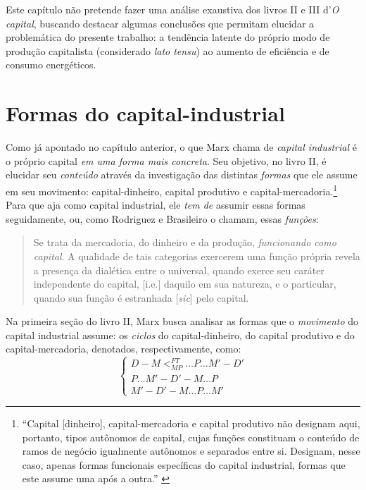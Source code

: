 Este capítulo não pretende fazer uma análise exaustiva dos livros II e III d'\textit{O capital}, buscando destacar algumas conclusões que permitam elucidar a problemática do presente trabalho: a tendência latente do próprio modo de produção capitalista (considerado \textit{lato tensu}) ao aumento de eficiência e de consumo energéticos. 

\section{Formas do capital-industrial}
Como já apontado no capítulo anterior, o que Marx chama de \textit{capital industrial} é o próprio capital \textit{em uma forma mais concreta}. Seu objetivo, no livro II, é elucidar seu \textit{conteúdo} através da investigação das distintas \textit{formas} que ele assume em seu movimento: capital-dinheiro, capital produtivo e capital-mercadoria.\footnote{``Capital [dinheiro], capital-mercadoria e capital produtivo não designam aqui, portanto, tipos autônomos de capital, cujas funções constituam o conteúdo de ramos de negócio igualmente autônomos e separados entre si. Designam, nesse caso, apenas formas funcionais específicas do capital industrial, formas que este assume uma após a outra.'' \parencite[p. 131]{Marx2014}} Para que aja como capital industrial, ele \textit{tem de} assumir essas formas seguidamente, ou, como Rodriguez e Brasileiro o chamam, essas \textit{funções}: 
\begin{quote}
    Se trata da mercadoria, do dinheiro e da produção, \textit{funcionando como capital}. A qualidade de tais categorias exercerem uma função própria revela a presença da dialética entre o universal, quando exerce seu caráter independente do capital, [i.e.] daquilo em sua natureza, e o particular, quando sua função é estranhada [\textit{sic}] pelo capital. \parencite[p. 4, grifo meu]{Rodriguez2017}
\end{quote}

Na primeira seção do livro II, Marx busca analisar as formas que o \textit{movimento} do capital industrial assume: os \textit{ciclos} do capital-dinheiro, do capital produtivo e do capital-mercadoria, denotados, respectivamente, como:
$$
\begin{cases}
D-M\Big <^{FT}_{MP} \dots P \dots M' - D' \\
P \dots M' - D' - M \dots P \\
M' - D' - M \dots P \dots M'
\end{cases}
$$

